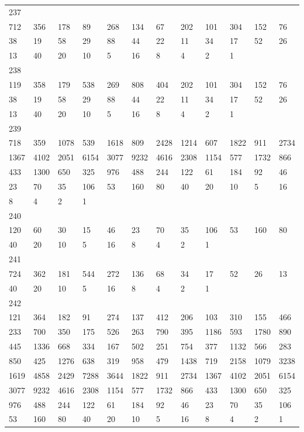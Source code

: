 \begin{longtable}{llllllllllll}
237&&&&&&&&&&&\\
712& 356& 178& 89& 268& 134& 67& 202& 101& 304& 152& 76\\
38& 19& 58& 29& 88& 44& 22& 11& 34& 17& 52& 26\\
13& 40& 20& 10& 5& 16& 8& 4& 2& 1& \\

238&&&&&&&&&&&\\
119& 358& 179& 538& 269& 808& 404& 202& 101& 304& 152& 76\\
38& 19& 58& 29& 88& 44& 22& 11& 34& 17& 52& 26\\
13& 40& 20& 10& 5& 16& 8& 4& 2& 1& \\

239&&&&&&&&&&&\\
718& 359& 1078& 539& 1618& 809& 2428& 1214& 607& 1822& 911& 2734\\
1367& 4102& 2051& 6154& 3077& 9232& 4616& 2308& 1154& 577& 1732& 866\\
433& 1300& 650& 325& 976& 488& 244& 122& 61& 184& 92& 46\\
23& 70& 35& 106& 53& 160& 80& 40& 20& 10& 5& 16\\
8& 4& 2& 1& \\

240&&&&&&&&&&&\\
120& 60& 30& 15& 46& 23& 70& 35& 106& 53& 160& 80\\
40& 20& 10& 5& 16& 8& 4& 2& 1& \\

241&&&&&&&&&&&\\
724& 362& 181& 544& 272& 136& 68& 34& 17& 52& 26& 13\\
40& 20& 10& 5& 16& 8& 4& 2& 1& \\

242&&&&&&&&&&&\\
121& 364& 182& 91& 274& 137& 412& 206& 103& 310& 155& 466\\
233& 700& 350& 175& 526& 263& 790& 395& 1186& 593& 1780& 890\\
445& 1336& 668& 334& 167& 502& 251& 754& 377& 1132& 566& 283\\
850& 425& 1276& 638& 319& 958& 479& 1438& 719& 2158& 1079& 3238\\
1619& 4858& 2429& 7288& 3644& 1822& 911& 2734& 1367& 4102& 2051& 6154\\
3077& 9232& 4616& 2308& 1154& 577& 1732& 866& 433& 1300& 650& 325\\
976& 488& 244& 122& 61& 184& 92& 46& 23& 70& 35& 106\\
53& 160& 80& 40& 20& 10& 5& 16& 8& 4& 2& 1\\


\end{longtable}

